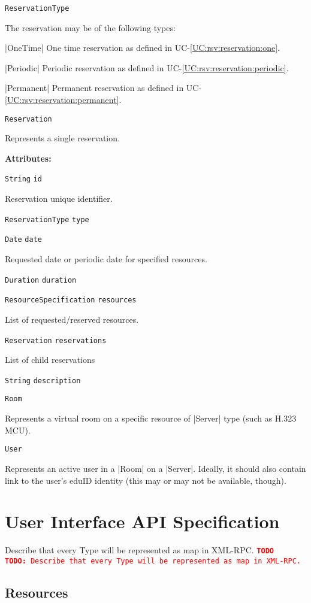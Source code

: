 \documentclass[a4paper]{report}
\newcommand{\APIcode}[1]{\lstinline[style=myinline]!#1!}
\newcommand{\APIcmd}[1]{%
\item \APIcode{#1}%

}
\newenvironment{APIattrs}{%

\textbf{Attributes:}\begin{compactitem}}{\end{compactitem}}
\newcommand{\APIattr}[2]{\item{\APIcode{#2} \APIcode{#1}}

}
\newenvironment{APIdef}{\begin{itemize}}{\end{itemize}}
\newcommand{\UCref}[1]{UC-\ref{UC:#1}}
\newcommand{\TODO}[1]{%
\def\empty{}%
\def\prvniparametr{#1}%
\ifx\prvniparametr\empty%
\begingroup\tt\textcolor{red}{\noindent\textbf{TODO}}\endgroup
\else%
\begingroup\tt\textcolor{red}{\noindent\textbf{TODO:}\ #1}\endgroup
\fi%
}
\begin{document}
\begin{APIdef}
\APIcmd{ReservationType}
The reservation may be of the following types:
\begin{compactitem}
\item |OneTime| One time reservation as defined in \UCref{rsv:reservation:one}.
\item |Periodic| Periodic reservation as defined in \UCref{rsv:reservation:periodic}.
\item |Permanent| Permanent reservation as defined in \UCref{rsv:reservation:permanent}.
\end{compactitem}


\APIcmd{Reservation}
Represents a single reservation.
\begin{APIattrs}
\APIattr{id}{String} Reservation unique identifier.
\APIattr{type}{ReservationType}
\APIattr{date}{Date}
Requested date or periodic date for specified resources.
\APIattr{duration}{Duration}
\APIattr{resources}{ResourceSpecification}
List of requested/reserved resources.
\APIattr{reservations}{Reservation}
List of child reservations
\APIattr{description}{String}
\end{APIattrs}


\APIcmd{Room}
Represents a virtual room on a specific resource of |Server| type (such as H.323 MCU).


\APIcmd{User}
Represents an active user in a |Room| on a |Server|. Ideally, it should also contain link to the user's eduID identity (this may or may not be available, though).

\end{APIdef}




\chapter{User Interface API Specification}

\TODO{Describe that every Type will be represented as map in XML-RPC.}

\section{Resources}
\end{document}
